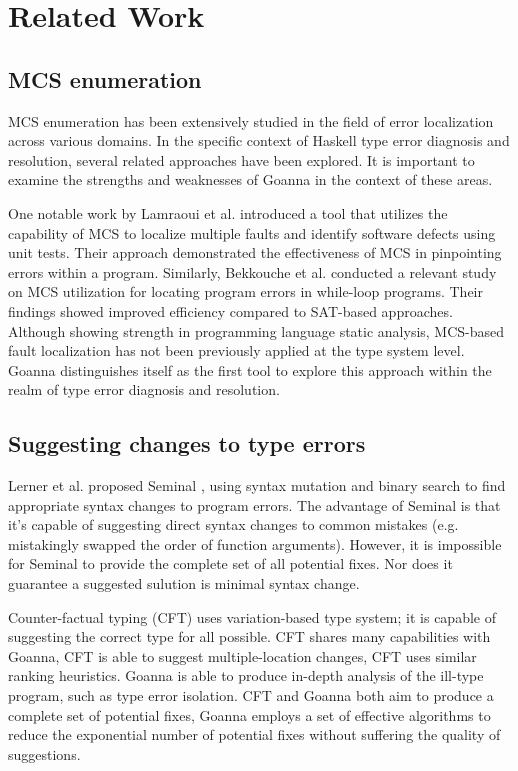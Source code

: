     \section{Related Work} \label{sec:related-work}
	\subsection{MCS enumeration}
	
    MCS enumeration has been extensively studied in the field of error localization across various domains. In the specific context of Haskell type error diagnosis and resolution, several related approaches have been explored. It is important to examine the strengths and weaknesses of Goanna in the context of these areas.

    One notable work by Lamraoui et al. introduced a tool \cite{Lamraoui2016-wr} that utilizes the capability of MCS to localize multiple faults and identify software defects using unit tests. Their approach demonstrated the effectiveness of MCS in pinpointing errors within a program. Similarly, Bekkouche et al. conducted a relevant study  \cite{Bekkouche2015-is}  on MCS utilization for locating program errors in while-loop programs. Their findings showed improved efficiency compared to SAT-based approaches. Although showing strength in programming language static analysis, MCS-based fault localization has not been previously applied at the type system level. Goanna distinguishes itself as the first tool to explore this approach within the realm of type error diagnosis and resolution.

    \subsection{Suggesting changes to type errors}
   Lerner et al. proposed Seminal \cite{Lerner2007-mu}, using syntax mutation and binary search to find appropriate syntax changes to program errors. The advantage of Seminal is that it's capable of suggesting direct syntax changes to common mistakes (e.g. mistakingly swapped the order of function arguments). However, it is impossible for Seminal to provide the complete set of all potential fixes. Nor does it guarantee a suggested sulution is minimal syntax change.
   
   Counter-factual typing (CFT) \cite{Chen2014-dz,Chen2020-ad} uses variation-based type system; it is capable of suggesting the correct type for all possible. CFT shares many capabilities with Goanna, CFT is able to suggest multiple-location changes, CFT uses similar ranking heuristics. Goanna is able to produce in-depth analysis of the ill-type program, such as type error isolation. CFT and Goanna both aim to produce a complete set of potential fixes, Goanna employs a set of effective algorithms to reduce the exponential number of potential fixes without suffering the quality of suggestions. 
   
